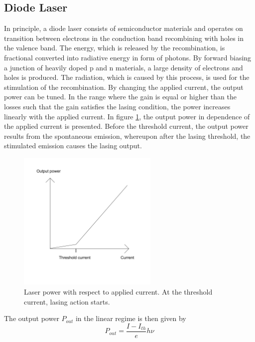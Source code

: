 \documentclass[10pt, a4paper, notitlepage, DIV=15]{scrartcl}
\begin{document}
\subsection{Diode Laser}
In principle, a diode laser consists of semiconductor materials and operates on transition between electrons in the conduction band recombining with holes in the valence band. The energy, which is released by the recombination, is fractional converted into radiative energy in form of photons. By forward biasing a junction of heavily doped p and n materials, a large density of electrons and holes is produced. The radiation, which is caused by this process, is used for the stimulation of the recombination. \cite{lasers}\newline By changing the applied current, the output power can be tuned. In the range where the gain is equal or higher than the losses such that the gain satisfies the lasing condition, the power increases linearly with the applied current. In figure \ref{fig:threshold}, the output power in dependence of the applied current is presented. Before the threshold current, the output power results from the spontaneous emission, whereupon after the lasing threshold, the stimulated emission causes the lasing output.  
\begin{figure}[h]
	\centering
	\includegraphics[width=0.6\textwidth]{threshold}
	\caption{Laser power with respect to applied current. At the threshold current, lasing action starts.}
	\label{fig:threshold}
\end{figure}
\newline
The output power $P_{out}$ in the linear regime is then given by \cite{laserphysics}
\begin{equation} \label{eq:threshold_current}
	P_{out} = \frac{I-I_{th}}{e}h\nu
\end{equation} 
\end{document}
